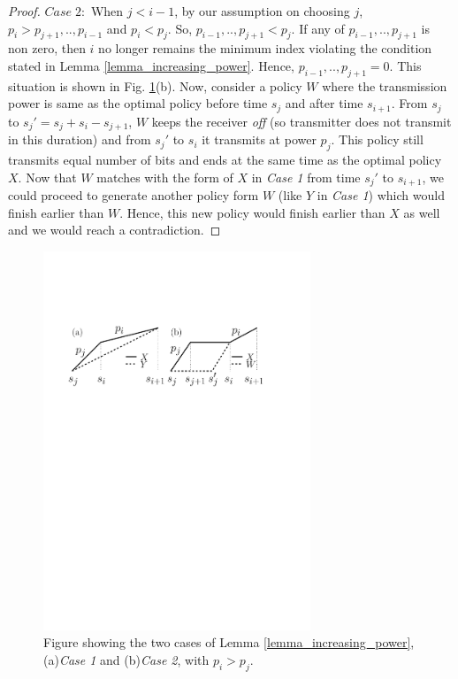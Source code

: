 \begin{proof}
$Case\;2:$ When $j<i-1$, by our assumption on choosing $j$, $p_i>p_{j+1},..,p_{i-1}$ and $p_i<p_{j}$. So, $p_{i-1},..,p_{j+1}<p_j$. If any of $p_{i-1},..,p_{j+1}$ is non zero, then $i$ no longer remains the minimum index violating the condition stated in Lemma \ref{lemma_increasing_power}. Hence, $p_{i-1},..,p_{j+1}=0$. This situation is shown in Fig. \ref{Lemma1}(b). Now, consider a policy $W$ where the transmission power is same as the optimal policy before time $s_j$ and after time $s_{i+1}$. From $s_j$ to $s_j'=s_j+s_{i}-s_{j+1}$, $W$ keeps the receiver \textit{off} (so transmitter does not transmit in this duration) and from $s_j'$ to $s_{i}$ it transmits at power $p_j$. This policy still transmits equal number of bits and ends at the same time as the optimal policy $X$. Now that $W$ matches with the form of $X$ in \textit{Case 1} from time $s_j'$ to $s_{i+1}$, we could proceed to generate another policy form $W$ (like $Y$ in \textit{Case 1}) which would finish earlier than $W$. Hence, this new policy would finish earlier than $X$ as well and we would reach a contradiction. 
\end{proof}

\begin{figure}[htb]
  \centering
  \centerline{\includegraphics[width=8cm]{Lemma1.pdf}}
\caption{Figure showing the two cases of Lemma \ref{lemma_increasing_power}, (a)\textit{Case 1}   and (b)\textit{Case 2}, with $p_i>p_j$.}\label{Lemma1}
\end{figure}


